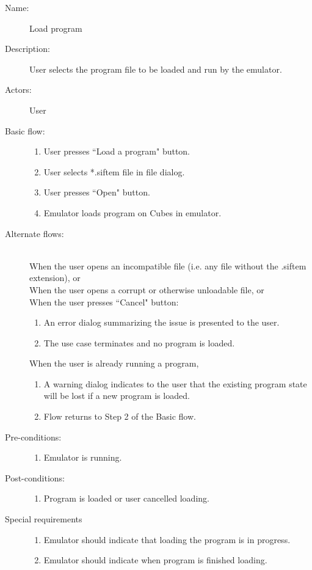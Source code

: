 \documentclass[12pt]{article}
\begin{document}
    \begin{description}
      \item[Name:] Load program
      \item[Description:] User selects the program file to be loaded and run by the emulator.
      \item[Actors:] User
      \item[Basic flow:] \hfill 
        \begin{enumerate}
	  \item{User presses ``Load a program" button.}
	  \item{User selects *.siftem file in file dialog.}
	  \item{User presses ``Open" button.}
	  \item{Emulator loads program on Cubes in emulator.}
        \end{enumerate}
      \item[Alternate flows:] \hfill \\
	When the user opens an incompatible file (i.e. any file without the .siftem extension), or \\
	When the user opens a corrupt or otherwise unloadable file, or \\
	When the user presses ``Cancel" button:
        \begin{enumerate}
			\item{An error dialog summarizing the issue is presented to the user.}
			\item{The use case terminates and no program is loaded.}
        \end{enumerate}
	When the user is already running a program,
		\begin{enumerate}
			\item{A warning dialog indicates to the user that the existing program state will be lost if a new program is loaded.}
			\item{Flow returns to Step 2 of the Basic flow.}
		\end{enumerate}
      \item[Pre-conditions:] \hfill
        \begin{enumerate}
          \item{Emulator is running.}
        \end{enumerate}
      \item[Post-conditions:] \hfill
        \begin{enumerate}
	  \item{Program is loaded or user cancelled loading.}
        \end{enumerate}
      \item[Special requirements] \hfill
        \begin{enumerate}
          \item{Emulator should indicate that loading the program is in progress.}
          \item{Emulator should indicate when program is finished loading.}
        \end{enumerate}
    \end{description}
\newpage
\end{document}
